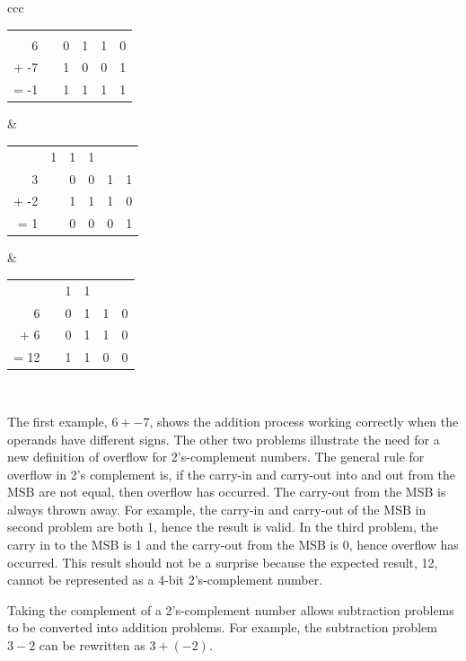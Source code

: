 {\small
    \begin{tabular}{ccc}
        \begin{tabular}{r|rrrrr}
            &   &   &   &   &     \\
            6 &   & 0 & 1 & 1 & 0   \\
            + -7 &   & 1 & 0 & 0 & 1   \\ \hline
            = -1 &   & 1 & 1 & 1 & 1   \\
        \end{tabular}
        &
        \begin{tabular}{r|rrrrr}
            & 1 & 1 & 1 &   &     \\
            3 &   & 0 & 0 & 1 & 1   \\
            + -2 &   & 1 & 1 & 1 & 0   \\ \hline
            =  1 &   & 0 & 0 & 0 & 1   \\
        \end{tabular}
        &
        \begin{tabular}{r|rrrrr}
            &   & 1 & 1 &   &     \\
            6 &   & 0 & 1 & 1 & 0   \\
            +  6 &   & 0 & 1 & 1 & 0   \\ \hline
            = 12 &   & 1 & 1 & 0 & 0   \\
        \end{tabular} \\
    \end{tabular}
}

The first example,
$6 + -7$, shows  the addition process working correctly when
the operands have different signs.  The other two problems
illustrate the need for a new definition of overflow for 2's-complement
numbers.  The general rule for overflow in 2's complement
is, \label{page:Ovf} if the carry-in and carry-out
into and out from the MSB are not equal, then overflow has
occurred.  The carry-out from the MSB is always thrown away.
For example, the carry-in and carry-out of the MSB in second
problem are both 1, hence the result is valid.  In the third
problem, the carry in to the MSB is 1 and the carry-out from the
MSB is 0, hence overflow has occurred.  This result should not be a
surprise because the expected result, 12, cannot be represented
as a 4-bit 2's-complement number.

Taking the complement of a 2's-complement number allows subtraction
problems to be converted into addition problems.  \label{page:2sub}
For example, the subtraction problem $3 - 2$ can be rewritten as
$3 + (-2)$.

